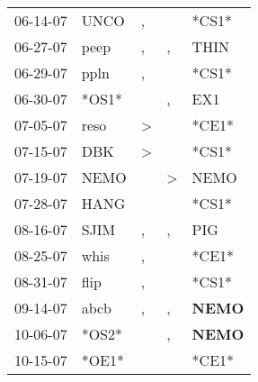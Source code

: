 \begin{supertabular}{p{0.07\textwidth}p{0.06\textwidth}p{0.02\textwidth}p{0.02\textwidth}p{0.06\textwidth}}
          06-14-07\textsuperscript{} &           UNCO\textsuperscript{} &                , &               &                            *CS1* \\
          06-27-07\textsuperscript{} &           peep\textsuperscript{} &                , &             , &           THIN\textsuperscript{} \\
          06-29-07\textsuperscript{} &           ppln\textsuperscript{} &                , &               &                            *CS1* \\
          06-30-07\textsuperscript{} &                            *OS1* &                  &             , &            EX1\textsuperscript{} \\
          07-05-07\textsuperscript{} &           reso\textsuperscript{} &     \textgreater &               &                            *CE1* \\
          07-15-07\textsuperscript{} &            DBK\textsuperscript{} &     \textgreater &               &                            *CS1* \\
          07-19-07\textsuperscript{} &           NEMO\textsuperscript{} &                  &  \textgreater &           NEMO\textsuperscript{} \\
          07-28-07\textsuperscript{} &           HANG\textsuperscript{} &                  &               &                            *CS1* \\
          08-16-07\textsuperscript{} &           SJIM\textsuperscript{} &                , &             , &            PIG\textsuperscript{} \\
          08-25-07\textsuperscript{} &           whis\textsuperscript{} &                , &               &                            *CE1* \\
          08-31-07\textsuperscript{} &           flip\textsuperscript{} &                , &               &                            *CS1* \\
          09-14-07\textsuperscript{} &           abcb\textsuperscript{} &                , &             , &  \textbf{NEMO\textsuperscript{}} \\
          10-06-07\textsuperscript{} &                            *OS2* &                  &             , &  \textbf{NEMO\textsuperscript{}} \\
          10-15-07\textsuperscript{} &                            *OE1* &                  &               &                            *CE1* \\

\end{supertabular}
